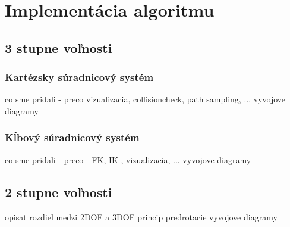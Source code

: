 \section{Implementácia algoritmu}
\label{kap:4}

\subsection{3 stupne voľnosti}

\subsubsection{Kartézsky súradnicový systém}

co sme pridali - preco 
 vizualizacia, collisioncheck, path sampling, ...  
 vyvojove diagramy 

\subsubsection{Kĺbový súradnicový systém}
 co sme pridali - preco 
 - FK, IK , vizualizacia, ... 
 vyvojove diagramy 

\subsection{2 stupne voľnosti}

 opisat rozdiel medzi 2DOF a 3DOF 
 princip predrotacie
 vyvojove diagramy 

